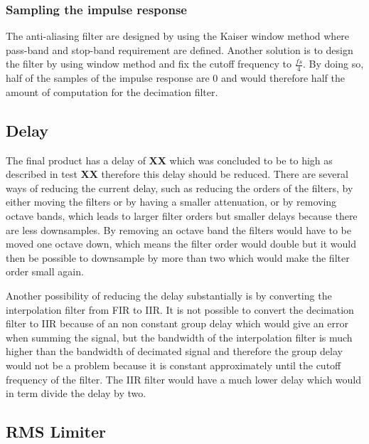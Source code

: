 \subsubsection*{Sampling the impulse response}
The anti-aliasing filter are designed by using the Kaiser window method where pass-band and stop-band requirement are defined. Another solution is to design the filter by using window method and fix the cutoff frequency to $\frac{fs}{4}$. By doing so, half of the samples of the impulse response are 0 and would therefore half the amount of computation for the decimation filter.






\subsection*{Delay}
The final product has a delay of \textbf{XX} which was concluded to be to high as described in test \textbf{XX} therefore this delay should be reduced. There are several ways of reducing the current delay, such as reducing the orders of the filters, by either moving the filters or by having a smaller attenuation, or by removing octave bands, which leads to larger filter orders but smaller delays because there are less downsamples. By removing an octave band the filters would have to be moved one octave down, which means the filter order would double but it would then be possible to downsample by more than two which would make the filter order small again.

Another possibility of reducing the delay substantially is by converting the interpolation filter from FIR to IIR. It is not possible to convert the decimation filter to IIR because of an non constant group delay which would give an error when summing the signal, but the bandwidth of the interpolation filter is much higher than the bandwidth of decimated signal and therefore the group delay would not be a problem because it is constant approximately until the cutoff frequency of the filter. The IIR filter would have a much lower delay which would in term divide the delay by two.   

\subsection*{RMS Limiter}



